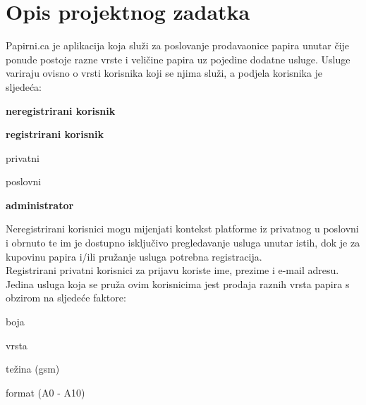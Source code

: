 \chapter{Opis projektnog zadatka}
		
	
		
		\normalsize{Papirni.ca je aplikacija koja služi za poslovanje prodavaonice papira unutar čije ponude postoje razne vrste i veličine papira uz pojedine dodatne usluge. Usluge variraju ovisno o vrsti korisnika koji se njima služi, a podjela korisnika je sljedeća: }
		
		\begin{packed_enum}
			\item  \textbf{neregistrirani korisnik}
			\item  \textbf{registrirani korisnik}
			
			\begin{packed_enum}
				
				\item privatni
				\item poslovni
				
			\end{packed_enum}
			\item  \textbf{administrator}
			
			
		\end{packed_enum}
	
		\noindent \normalsize{Neregistrirani korisnici mogu mijenjati kontekst platforme iz privatnog u poslovni i obrnuto te im je dostupno isključivo pregledavanje usluga unutar istih, dok je za kupovinu papira i/ili pružanje usluga potrebna registracija.} \\
		
		\noindent \normalsize{Registrirani privatni korisnici za prijavu koriste ime, prezime i e-mail adresu. Jedina usluga koja se pruža ovim korisnicima jest prodaja raznih vrsta papira s obzirom na sljedeće faktore: }
		
		\begin{packed_enum}
			\item \normalsize{boja}
			\item  \normalsize{vrsta}
			\item  \normalsize{težina (gsm)}
			\item  \normalsize{format (A0 - A10)}
		\end{packed_enum}
	
